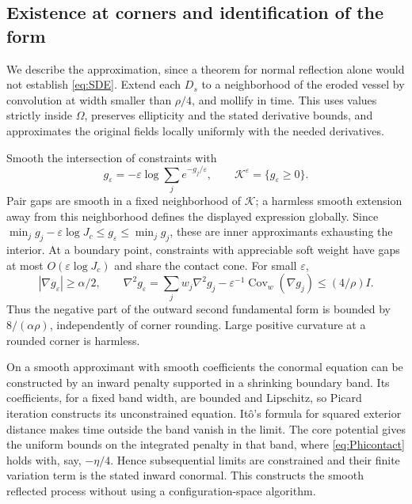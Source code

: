 \documentclass[11pt]{article}
\numberwithin{equation}{section}
\theoremstyle{definition}
\theoremstyle{remark}\newtheorem{remark}[theorem]{Remark}
\newcommand{\K}{\mathcal K}
\begin{document}
\subsection{Existence at corners and identification of the form}
\label{app:existence}

We describe the approximation, since a theorem for normal reflection alone
would not establish \eqref{eq:SDE}. Extend each $D_s$ to a neighborhood of
the eroded vessel by convolution at width smaller than $\rho/4$, and
mollify in time. This uses values strictly inside $\Omega$, preserves
ellipticity and the stated derivative bounds, and approximates the original
fields locally uniformly with the needed derivatives.

Smooth the intersection of constraints with
\[
 g_\varepsilon=-\varepsilon\log\sum_j e^{-g_j/\varepsilon},
 \qquad\K^\varepsilon=\{g_\varepsilon\ge0\}.
\]
Pair gaps are smooth in a fixed neighborhood of $\K$; a harmless smooth
extension away from this neighborhood defines the displayed expression
globally. Since $\min_jg_j-\varepsilon\log J_c
\le g_\varepsilon\le\min_jg_j$, these are inner approximants exhausting
the interior. At a boundary point, constraints with appreciable soft
weight have gaps at most $O(\varepsilon\log J_c)$ and share the contact
cone. For small $\varepsilon$,
\begin{equation}\label{eq:smoothgeometry}
 |\nabla g_\varepsilon|\ge\alpha/2,
 \qquad \nabla^2g_\varepsilon
 =\sum_jw_j\nabla^2g_j
       -\varepsilon^{-1}\operatorname{Cov}_{w}(\nabla g_j)
 \le(4/\rho)I.
\end{equation}
Thus the negative part of the outward second fundamental form is bounded
by $8/(\alpha\rho)$, independently of corner rounding. Large positive
curvature at a rounded corner is harmless.

On a smooth approximant with smooth coefficients the conormal equation
can be constructed by an inward penalty supported in a shrinking boundary
band. Its coefficients, for a fixed band width, are bounded and Lipschitz,
so Picard iteration constructs its unconstrained equation. It\^o's formula
for squared exterior distance makes time outside the band vanish in the
limit. The core potential gives the uniform bounds on the integrated
penalty in that band, where \eqref{eq:Phicontact} holds with, say,
$-\eta/4$. Hence subsequential limits are constrained and their finite
variation term is the stated inward conormal. This constructs the smooth
reflected process without using a configuration-space algorithm.
\end{document}
